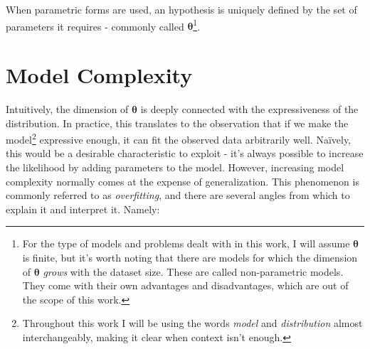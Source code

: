 When parametric forms are used, an hypothesis is uniquely defined by the set of
parameters it requires - commonly called $\bm{\theta}$\footnote{For the type of models
and problems dealt with in this work, I will assume $\bm{\theta}$ is finite, but it's
worth noting that there are models for which the dimension of $\bm{\theta}$ \emph{grows}
with the dataset size. These are called non-parametric models. They come with
their own advantages and disadvantages, which are out of the scope of this work.}.

\section{Model Complexity}
\label{section:modelcomplexity}
Intuitively, the dimension of $\bm{\theta}$ is deeply connected with the expressiveness
of the distribution. In practice, this translates to the observation that if we
make the model\footnote{Throughout this work I will be using the words \emph{model}
and \emph{distribution} almost interchangeably, making it clear when context isn't
enough.} expressive enough, it can fit the observed data arbitrarily well. Naïvely,
this would be a desirable characteristic to exploit - it's always possible to increase
the likelihood by adding parameters to the model. However, increasing model
complexity normally comes at the expense of generalization. This phenomenon is
commonly referred to as \emph{overfitting}, and there are several
angles from which to explain it and interpret it. Namely:
